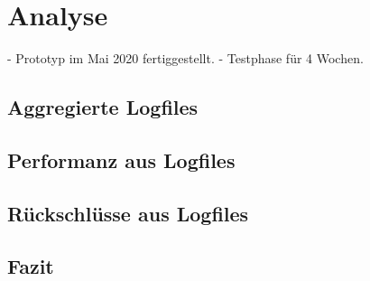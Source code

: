 \chapter{Analyse}
- Prototyp im Mai 2020 fertiggestellt. 
- Testphase für 4 Wochen. 

\section{Aggregierte Logfiles}

\section{Performanz aus Logfiles}
\ToDo{}

\section{Rückschlüsse aus Logfiles}
\ToDo{}

\section{Fazit}

